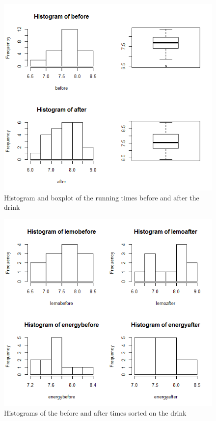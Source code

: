 \documentclass{article}
\begin{document}
    \begin{figure}
      \includegraphics[scale=0.3]{../results/GraphBeforeAfter.png}
      \caption{Histogram and boxplot of the running times before and after the drink}
      \label{fig:RunBefAf}
    \end{figure}
    \begin{figure}
      \includegraphics[scale=0.3]{../results/HistLemoEnergy.png}
      \caption{Histograms of the before and after times sorted on the drink}
      \label{fig:RunDrink}
    \end{figure}
\end{document}
